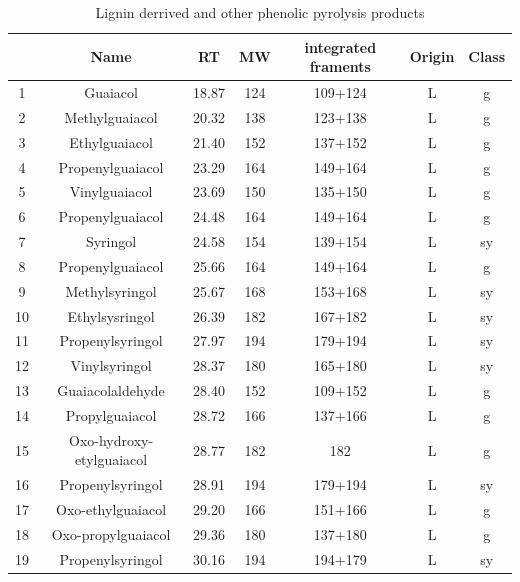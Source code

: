 \documentclass[preprint,review,12pt]{elsarticle}
\begin{document}


\newpage
\begin{table}[h!]
\begin{center}
\caption{Lignin derrived and other phenolic pyrolysis products}
\label{tab:phprod}
{\tiny
\begin{tabular}{ccccccc}
  \hline
 & Name & RT & MW & integrated framents & Origin & Class \\ 
  \hline
1 & Guaiacol & 18.87 & 124 & 109+124 & L & g \\ 
  2 & Methylguaiacol & 20.32 & 138 & 123+138 & L & g \\ 
  3 & Ethylguaiacol & 21.40 & 152 & 137+152 & L & g \\ 
  4 & Propenylguaiacol & 23.29 & 164 & 149+164 & L & g \\ 
  5 & Vinylguaiacol & 23.69 & 150 & 135+150 & L & g \\ 
  6 & Propenylguaiacol & 24.48 & 164 & 149+164 & L & g \\ 
  7 & Syringol & 24.58 & 154 & 139+154 & L & sy \\ 
  8 & Propenylguaiacol & 25.66 & 164 & 149+164 & L & g \\ 
  9 & Methylsyringol & 25.67 & 168 & 153+168 & L & sy \\ 
  10 & Ethylsysringol & 26.39 & 182 & 167+182 & L & sy \\ 
  11 & Propenylsyringol & 27.97 & 194 & 179+194 & L & sy \\ 
  12 & Vinylsyringol & 28.37 & 180 & 165+180 & L & sy \\ 
  13 & Guaiacolaldehyde & 28.40 & 152 & 109+152 & L & g \\ 
  14 & Propylguaiacol & 28.72 & 166 & 137+166 & L & g \\ 
  15 & Oxo-hydroxy-etylguaiacol & 28.77 & 182 & 182 & L & g \\ 
  16 & Propenylsyringol & 28.91 & 194 & 179+194 & L & sy \\ 
  17 & Oxo-ethylguaiacol & 29.20 & 166 & 151+166 & L & g \\ 
  18 & Oxo-propylguaiacol & 29.36 & 180 & 137+180 & L & g \\ 
  19 & Propenylsyringol & 30.16 & 194 & 194+179 & L & sy \\ 

\end{tabular}}
\end{center}
\end{table}
\end{document}

